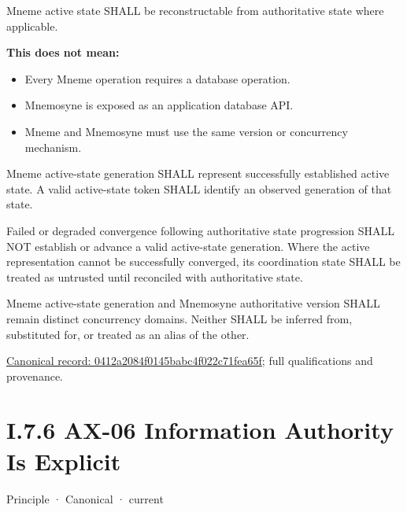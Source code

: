 Mneme active state SHALL be reconstructable from authoritative state
where applicable.



\textbf{This does not mean:}



\begin{itemize}


\item Every Mneme operation requires a database operation.

\item Mnemosyne is exposed as an application database API.

\item Mneme and Mnemosyne must use the same version or concurrency mechanism.

\end{itemize}


Mneme active-state generation SHALL represent successfully established active state. A valid active-state token SHALL identify an observed generation of that state.



Failed or degraded convergence following authoritative state progression SHALL NOT establish or advance a valid active-state generation. Where the active representation cannot be successfully converged, its coordination state SHALL be treated as untrusted until reconciled with authoritative state.



Mneme active-state generation and Mnemosyne authoritative version SHALL remain distinct concurrency domains. Neither SHALL be inferred from, substituted for, or treated as an alias of the other.


{\footnotesize \href{../../../../../../../continuum/motivation/principle/0412a2084f0145babc4f022c71fea65f.md}{Canonical record: 0412a2084f0145babc4f022c71fea65f}; full qualifications and provenance.}\par
\section*{I.7.6 AX-06 Information Authority Is Explicit}
\label{navigation:I.7.6}

\label{element:952c3b6148ce4fce94b69f99a0c2fec7}
{\small Principle · Canonical · current}\par

